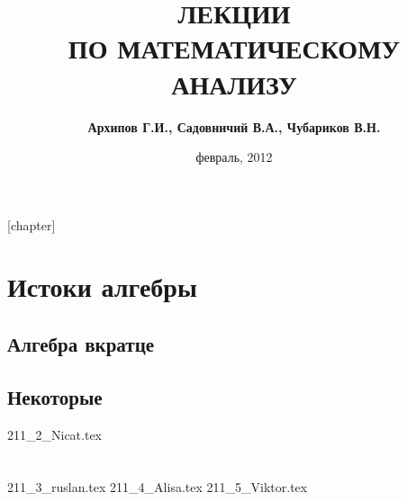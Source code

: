 \documentclass[12pt,titlepage]{report}
\begin{document}
\pagestyle{plain}
\title{\textbf{ЛЕКЦИИ \\ПО МАТЕМАТИЧЕСКОМУ \\АНАЛИЗУ}}
\author{\textbf{Архипов Г.И., Садовничий В.А., Чубариков В.Н.}}
\date{февраль, 2012}
\maketitle
{}[chapter]











%

\setcounter{chapter}{12}
\chapter{Истоки алгебры}
\section{Алгебра вкратце}
\section{Некоторые }
\setcounter{section}{2}
 {211_2_Nicat.tex}
\setcounter{chapter}{13}
\chapter{}
 {211_3_ruslan.tex}
 {211_4_Alisa.tex}
 {211_5_Viktor.tex}

\tableofcontents
\end{document}
